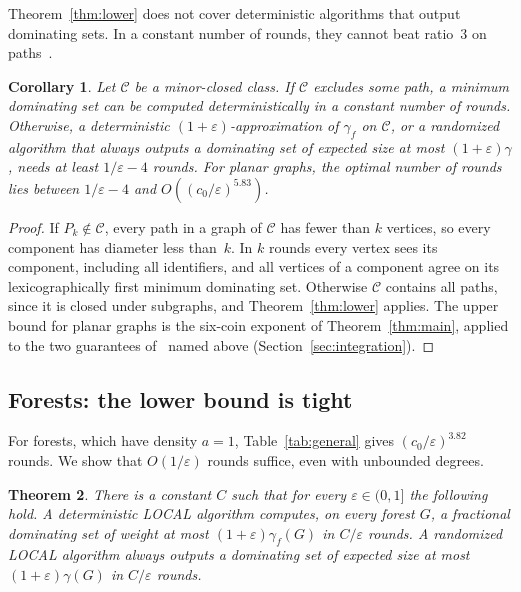 \documentclass[11pt]{article}
\newtheorem{theorem}{Theorem}
\newtheorem{corollary}[theorem]{Corollary}
\theoremstyle{remark}
\begin{document}
Theorem~\ref{thm:lower} does not cover deterministic algorithms that output dominating sets. In a
constant number of rounds, they cannot beat ratio~$3$ on paths~\cite[Thm.~8.7]{AS26}.

\begin{corollary}\label{cor:dichotomy}
Let $\mathcal C$ be a minor-closed class. If $\mathcal C$ excludes some path, a minimum dominating
set can be computed deterministically in a constant number of rounds. Otherwise,
a deterministic $(1+\varepsilon)$-approximation of $\gamma_f$ on $\mathcal C$, or a randomized
algorithm that always outputs a dominating set of expected size at most $(1+\varepsilon)\gamma$,
needs at least $1/\varepsilon-4$ rounds.
For planar graphs, the optimal number of rounds lies between $1/\varepsilon-4$ and
$O((c_0/\varepsilon)^{5.83})$.
\end{corollary}
\begin{proof}
If $P_k\notin\mathcal C$, every path in a graph of $\mathcal C$ has fewer than $k$ vertices, so every
component has diameter less than~$k$. In $k$ rounds every vertex sees its component, including all
identifiers, and all vertices of a component agree on its lexicographically first minimum dominating
set. Otherwise $\mathcal C$ contains all paths, since it is closed under subgraphs, and
Theorem~\ref{thm:lower} applies. The upper bound for planar graphs is the six-coin exponent
of Theorem~\ref{thm:main}, applied to the two guarantees of~\cite[Thm.~6.2]{AS26} named above
(Section~\ref{sec:integration}).
\end{proof}

\subsection{Forests: the lower bound is tight}\label{sec:forests}

For forests, which have density $a=1$, Table~\ref{tab:general} gives $(c_0/\varepsilon)^{3.82}$
rounds. We show that $O(1/\varepsilon)$ rounds suffice, even with unbounded degrees.

\begin{theorem}\label{thm:forests}
There is a constant $C$ such that for every $\varepsilon\in(0,1]$ the following hold. A deterministic
LOCAL algorithm computes, on every forest $G$, a fractional dominating set of weight at most
$(1+\varepsilon)\gamma_f(G)$ in $C/\varepsilon$ rounds. A randomized LOCAL algorithm always outputs a
dominating set of expected size at most $(1+\varepsilon)\gamma(G)$ in $C/\varepsilon$ rounds.
\end{theorem}
\end{document}
